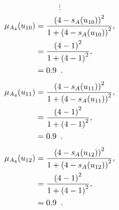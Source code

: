 \documentclass[a4paper,openany]{book}
\begin{document}
				\[
					\vdots
				\]
				\begin{align}
					\mu_{A_4}(u_{10}) &= \frac{\left(4-s_A(u_{10})\right)^2}{1 + \left(4-s_A(u_{10})\right)^2} ,\\
					&= \frac{\left(4-1\right)^2}{1 + \left(4-1\right)^2} \notag ,\\
					&= 0.9 \enspace. \notag
				\end{align}
				\begin{align}
					\mu_{A_4}(u_{11}) &= \frac{\left(4-s_A(u_{11})\right)^2}{1 + \left(4-s_A(u_{11})\right)^2} ,\\
					&= \frac{\left(4-1\right)^2}{1 + \left(4-1\right)^2} \notag ,\\
					&= 0.9 \enspace. \notag
				\end{align}
				\begin{align}
					\mu_{A_4}(u_{12}) &= \frac{\left(4-s_A(u_{12})\right)^2}{1 + \left(4-s_A(u_{12})\right)^2} ,\\
					&= \frac{\left(4-1\right)^2}{1 + \left(4-1\right)^2} \notag ,\\
					&= 0.9 \enspace. \notag
				\end{align}
\end{document}
